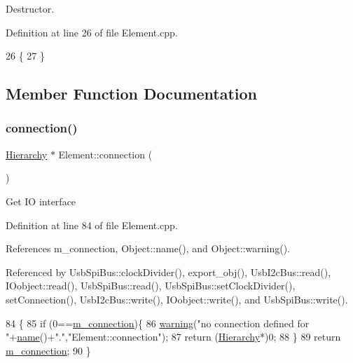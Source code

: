 Destructor. 



Definition at line 26 of file Element.\+cpp.


\begin{DoxyCode}
26                   \{
27 \}
\end{DoxyCode}


\subsection{Member Function Documentation}
\mbox{\label{classElement_af57444353c1ddf9fa0109801e97debf7}} 
\subsubsection{\texorpdfstring{connection()}{connection()}}
{\footnotesize\ttfamily \hyperlink{classHierarchy}{Hierarchy} $\ast$ Element\+::connection (\begin{DoxyParamCaption}{ }\end{DoxyParamCaption})}

Get IO interface 

Definition at line 84 of file Element.\+cpp.



References m\+\_\+connection, Object\+::name(), and Object\+::warning().



Referenced by Usb\+Spi\+Bus\+::clock\+Divider(), export\+\_\+obj(), Usb\+I2c\+Bus\+::read(), I\+Oobject\+::read(), Usb\+Spi\+Bus\+::read(), Usb\+Spi\+Bus\+::set\+Clock\+Divider(), set\+Connection(), Usb\+I2c\+Bus\+::write(), I\+Oobject\+::write(), and Usb\+Spi\+Bus\+::write().


\begin{DoxyCode}
84                               \{
85   \textcolor{keywordflow}{if} (0==\hyperlink{classElement_abe3de7a5dbbc9a6dd2d7e012e5fdb266}{m\_connection})\{
86     \hyperlink{classObject_a65cd4fda577711660821fd2cd5a3b4c9}{warning}(\textcolor{stringliteral}{"no connection defined for "}+\hyperlink{classObject_a300f4c05dd468c7bb8b3c968868443c1}{name}()+\textcolor{stringliteral}{"."},\textcolor{stringliteral}{"Element::connection"});
87     \textcolor{keywordflow}{return} (\hyperlink{classHierarchy}{Hierarchy}*)0;
88   \}
89   \textcolor{keywordflow}{return} \hyperlink{classElement_abe3de7a5dbbc9a6dd2d7e012e5fdb266}{m\_connection};
90 \}
\end{DoxyCode}
\mbox{\label{classElement_a32c0de27acb08e17251cef88c3e9303a}} 
